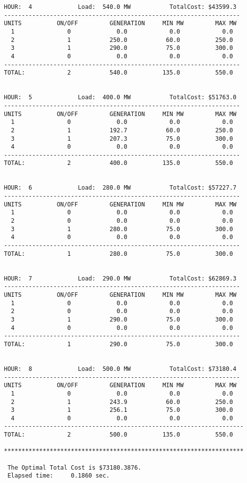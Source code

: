 \begin{verbatim}
HOUR:  4             Load:  540.0 MW           TotalCost: $43599.3
-------------------------------------------------------------------
UNITS          ON/OFF         GENERATION     MIN MW         MAX MW
  1               0             0.0            0.0            0.0
  2               1           250.0           60.0          250.0
  3               1           290.0           75.0          300.0
  4               0             0.0            0.0            0.0
-------------------------------------------------------------------
TOTAL:            2           540.0          135.0          550.0


HOUR:  5             Load:  400.0 MW           TotalCost: $51763.0
-------------------------------------------------------------------
UNITS          ON/OFF         GENERATION     MIN MW         MAX MW
  1               0             0.0            0.0            0.0
  2               1           192.7           60.0          250.0
  3               1           207.3           75.0          300.0
  4               0             0.0            0.0            0.0
-------------------------------------------------------------------
TOTAL:            2           400.0          135.0          550.0


HOUR:  6             Load:  280.0 MW           TotalCost: $57227.7
-------------------------------------------------------------------
UNITS          ON/OFF         GENERATION     MIN MW         MAX MW
  1               0             0.0            0.0            0.0
  2               0             0.0            0.0            0.0
  3               1           280.0           75.0          300.0
  4               0             0.0            0.0            0.0
-------------------------------------------------------------------
TOTAL:            1           280.0           75.0          300.0


HOUR:  7             Load:  290.0 MW           TotalCost: $62869.3
-------------------------------------------------------------------
UNITS          ON/OFF         GENERATION     MIN MW         MAX MW
  1               0             0.0            0.0            0.0
  2               0             0.0            0.0            0.0
  3               1           290.0           75.0          300.0
  4               0             0.0            0.0            0.0
-------------------------------------------------------------------
TOTAL:            1           290.0           75.0          300.0


HOUR:  8             Load:  500.0 MW           TotalCost: $73180.4
-------------------------------------------------------------------
UNITS          ON/OFF         GENERATION     MIN MW         MAX MW
  1               0             0.0            0.0            0.0
  2               1           243.9           60.0          250.0
  3               1           256.1           75.0          300.0
  4               0             0.0            0.0            0.0
--------------------------------------------------------------------
TOTAL:            2           500.0          135.0          550.0

********************************************************************

 The Optimal Total Cost is $73180.3876.
 Elapsed time:     0.1860 sec.

\end{verbatim}


